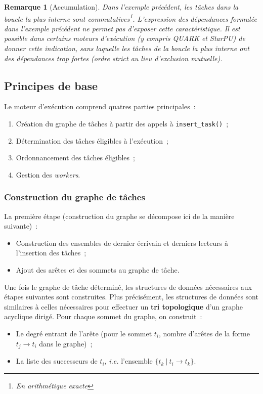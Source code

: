 \documentclass[11pt]{article}
\theoremstyle{plain} %
\newtheorem{rmq}[thm]{Remarque}
\theoremstyle{definition} %
\begin{document}
\begin{rmq}[Accumulation]
  \label{rmq:reduction}
  Dans l'exemple précédent, les tâches dans la boucle la plus interne sont commutatives\footnote{En arithmétique exacte}.
  L'expression des dépendances formulée dans l'exemple précédent ne permet pas d'exposer cette caractéristique.
  Il est possible dans certains moteurs d'exécution (y compris QUARK et StarPU) de donner cette indication, sans laquelle les tâches de la boucle la plus interne ont des dépendances trop fortes (ordre strict au lieu d'exclusion mutuelle).
\end{rmq}

\subsection{Principes de base}
\label{sec:principes-de-base}
Le moteur d'exécution comprend quatres parties principales~:
\begin{enumerate}
\item Création du graphe de tâches à partir des appels à \texttt{insert\_task()}~;
\item Détermination des tâches éligibles à l'exécution~;
\item Ordonnancement des tâches éligibles~;
\item Gestion des \emph{workers}.
\end{enumerate}

\subsubsection{Construction du graphe de tâches}
\label{sec:constr-du-graphe}
La première étape (construction du graphe se décompose ici de la manière suivante)~:
\begin{itemize}
\item Construction des ensembles de dernier écrivain et derniers lecteurs à l'insertion des tâches~;
\item Ajout des arêtes et des sommets au graphe de tâche.
\end{itemize}

Une fois le graphe de tâche déterminé, les structures de données nécessaires aux étapes suivantes sont construites.
Plus précisément, les structures de données sont similaires à celles nécessaires pour effectuer un \textbf{tri topologique} d'un graphe acyclique dirigé.
Pour chaque sommet du graphe, on construit~:
\begin{itemize}
\item Le degré entrant de l'arête (pour le sommet $t_i$, nombre d'arêtes de la forme $t_j \to t_i$ dans le graphe)~;
\item La liste des successeurs de $t_i$, \emph{i.e.} l'ensemble $\{t_k \ |\ t_i \to t_k\}$.
\end{itemize}
\end{document}
